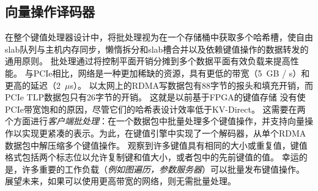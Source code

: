 
\subsection{向量操作译码器}
在整个键值处理器设计中，将批处理视为在一个存储桶中获取多个哈希槽，使自由slab队列与主机内存同步，懒惰拆分和slab槽合并以及依赖键值操作的数据转发的通用原则。
批处理通过将控制平面开销分摊到多个数据平面有效负载来提高性能。
与PCIe相比，网络是一种更加稀缺的资源，具有更低的带宽（5~GB / s）和更高的延迟（2~$\mu$s）。
以太网上的RDMA写数据包有88字节的报头和填充开销，而PCIe TLP数据包只有26字节的开销。
这就是以前基于FPGA的键值存储 \cite{blott13hotcloud,blott2015scaling} 没有使PCIe带宽饱和的原因，尽管它们的哈希表设计效率低于KV-Direct。
这需要在两个方面进行\textit {客户端批处理}：在一个数据包中批量处理多个键值操作，并支持向量操作以实现更紧凑的表示。为此，在键值引擎中实现了一个解码器，从单个RDMA数据包中解压缩多个键值操作。
观察到许多键值具有相同的大小或重复值，键值格式包括两个标志位以允许复制键和值大小，或者包中的先前键值的值。
幸运的是，许多重要的工作负载（\textit {例如图遍历，参数服务器}）可以批量发布键值操作。
展望未来，如果可以使用更高带宽的网络，则无需批量处理。
